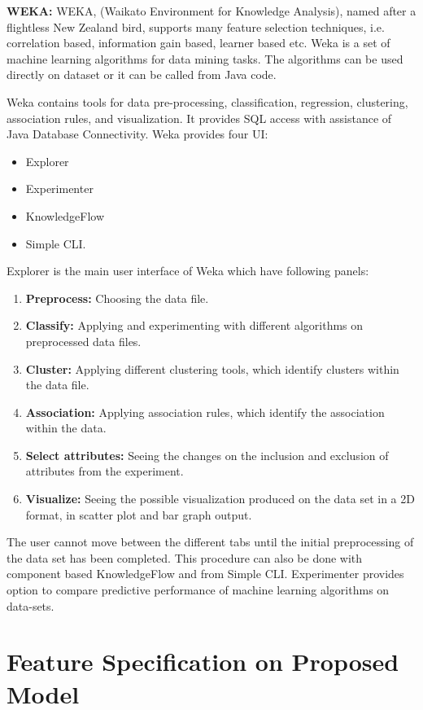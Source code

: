 \textbf{WEKA:} WEKA, (Waikato Environment for Knowledge Analysis), named after a flightless New Zealand bird, supports many feature selection techniques, i.e. correlation based, information gain based, learner based etc. Weka is a set of machine learning algorithms for data mining tasks. The algorithms can be used directly on dataset or it can be called from Java code. 

Weka contains tools for data pre-processing, classification, regression, clustering, association rules, and visualization. It provides SQL access with assistance of Java Database Connectivity. Weka provides four UI:
\begin{itemize}
    \item Explorer
    \item Experimenter
    \item KnowledgeFlow
    \item Simple CLI.
\end{itemize}
Explorer is the main user interface of Weka which have following panels:
\begin{enumerate}
    \item \textbf{Preprocess:} Choosing the data file.
	\item \textbf{Classify:} Applying and experimenting with different algorithms on preprocessed data files.
	\item \textbf{Cluster:} Applying different clustering tools, which identify clusters within the data file.
	\item \textbf{Association:} Applying association rules, which identify the association within the data.
	\item \textbf{Select attributes:} Seeing the changes on the inclusion and exclusion of attributes from the experiment.
	\item \textbf{Visualize:} Seeing the possible visualization produced on the data set in a 2D format, in scatter plot and bar graph output.
\end{enumerate}
The user cannot move between the different tabs until the initial preprocessing of the data set has been completed. This procedure can also be done with component based KnowledgeFlow and from Simple CLI. Experimenter provides option to compare predictive performance of machine learning algorithms on data-sets. 

\section{Feature Specification on Proposed Model}

